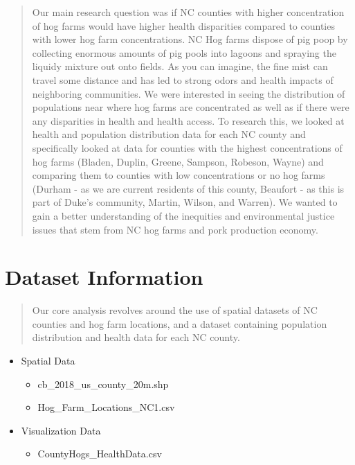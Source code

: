 \documentclass[
  12pt,
]{article}
\providecommand{\tightlist}{%
  \setlength{\itemsep}{0pt}\setlength{\parskip}{0pt}}
\begin{document}
\begin{quote}
Our main research question was if NC counties with higher concentration
of hog farms would have higher health disparities compared to counties
with lower hog farm concentrations. NC Hog farms dispose of pig poop by
collecting enormous amounts of pig pools into lagoons and spraying the
liquidy mixture out onto fields. As you can imagine, the fine mist can
travel some distance and has led to strong odors and health impacts of
neighboring communities. We were interested in seeing the distribution
of populations near where hog farms are concentrated as well as if there
were any disparities in health and health access. To research this, we
looked at health and population distribution data for each NC county and
specifically looked at data for counties with the highest concentrations
of hog farms (Bladen, Duplin, Greene, Sampson, Robeson, Wayne) and
comparing them to counties with low concentrations or no hog farms
(Durham - as we are current residents of this county, Beaufort - as this
is part of Duke's community, Martin, Wilson, and Warren). We wanted to
gain a better understanding of the inequities and environmental justice
issues that stem from NC hog farms and pork production economy.
\end{quote}

\newpage

\hypertarget{dataset-information}{%
\section{Dataset Information}\label{dataset-information}}

\begin{quote}
Our core analysis revolves around the use of spatial datasets of NC
counties and hog farm locations, and a dataset containing population
distribution and health data for each NC county.
\end{quote}

\begin{itemize}
\tightlist
\item
  Spatial Data

  \begin{itemize}
  \tightlist
  \item
    cb\_2018\_us\_county\_20m.shp
  \item
    Hog\_Farm\_Locations\_NC1.csv
  \end{itemize}
\item
  Visualization Data

  \begin{itemize}
  \tightlist
  \item
    CountyHogs\_HealthData.csv
  \end{itemize}
\end{itemize}
\end{document}
